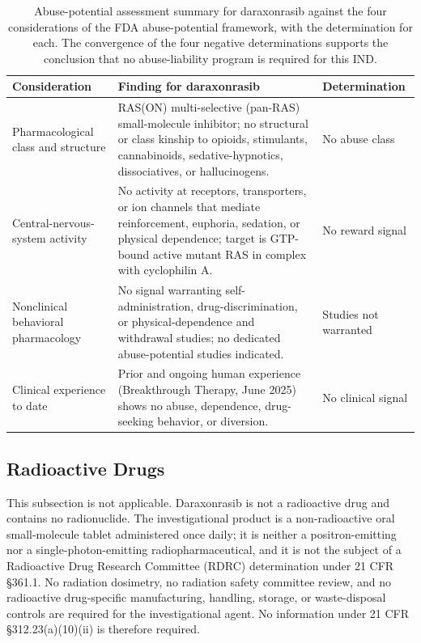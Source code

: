 \begin{table}[htbp]
\centering
\footnotesize
\caption{Abuse-potential assessment summary for daraxonrasib against the four
considerations of the FDA abuse-potential framework, with the determination for
each. The convergence of the four negative determinations supports the conclusion
that no abuse-liability program is required for this IND.}
\label{tab:abuse-potential}
\begin{tabularx}{\textwidth}{L{4.2cm} Y L{2.6cm}}
\toprule
\textbf{Consideration} & \textbf{Finding for daraxonrasib} & \textbf{Determination} \\
\midrule
Pharmacological class and structure & RAS(ON) multi-selective (pan-RAS) small-molecule inhibitor; no structural or class kinship to opioids, stimulants, cannabinoids, sedative-hypnotics, dissociatives, or hallucinogens. & No abuse class \\
Central-nervous-system activity & No activity at receptors, transporters, or ion channels that mediate reinforcement, euphoria, sedation, or physical dependence; target is GTP-bound active mutant RAS in complex with cyclophilin A. & No reward signal \\
Nonclinical behavioral pharmacology & No signal warranting self-administration, drug-discrimination, or physical-dependence and withdrawal studies; no dedicated abuse-potential studies indicated. & Studies not warranted \\
Clinical experience to date & Prior and ongoing human experience (Breakthrough Therapy, June 2025) shows no abuse, dependence, drug-seeking behavior, or diversion. & No clinical signal \\
\bottomrule
\end{tabularx}
\end{table}
\vspace*{-0.6cm}

\subsection{Radioactive Drugs}

This subsection is not applicable. Daraxonrasib is not a radioactive drug and
contains no radionuclide. The investigational product is a non-radioactive oral
small-molecule tablet administered once daily; it is neither a positron-emitting
nor a single-photon-emitting radiopharmaceutical, and it is not the subject of a
Radioactive Drug Research Committee (RDRC) determination under 21 CFR \S 361.1. No
radiation dosimetry, no radiation safety committee review, and no radioactive
drug-specific manufacturing, handling, storage, or waste-disposal controls are
required for the investigational agent. No information under 21 CFR
\S 312.23(a)(10)(ii) is therefore required.

